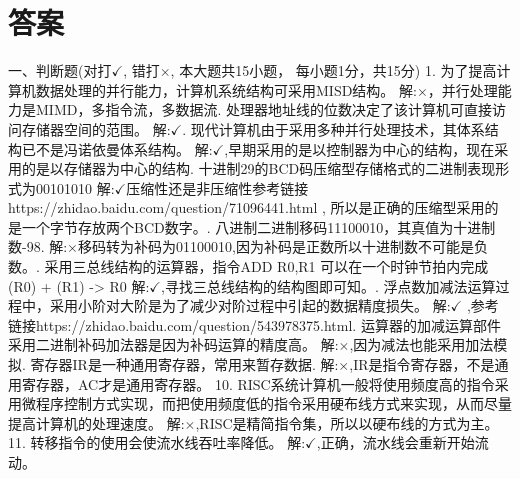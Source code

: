 \section{答案}
一、判断题(对打$\checkmark$, 错打$\times$, 本大题共15小题， 每小题1分，共15分)
1. 为了提高计算机数据处理的并行能力，计算机系统结构可采用MISD结构。\newline
解:$\times$，并行处理能力是MIMD，多指令流，多数据流. 处理器地址线的位数决定了该计算机可直接访问存储器空间的范围。\newline
解:$ \checkmark $. 现代计算机由于采用多种并行处理技术，其体系结构已不是冯诺依曼体系结构。\newline
解:$  \checkmark  $,早期采用的是以控制器为中心的结构，现在采用的是以存储器为中心的结构. 十进制29的BCD码压缩型存储格式的二进制表现形式为00101010\newline
解:$  \checkmark  $压缩性还是非压缩性参考链接 https://zhidao.baidu.com/question/71096441.html , 所以是正确的压缩型采用的是一个字节存放两个BCD数字。. 八进制二进制移码11100010，其真值为十进制数-98.\newline
解:$\times$移码转为补码为01100010,因为补码是正数所以十进制数不可能是负数。. 采用三总线结构的运算器，指令ADD R0,R1 可以在一个时钟节拍内完成 (R0) + (R1) -> R0\newline
解:$\checkmark$,寻找三总线结构的结构图即可知。. 浮点数加减法运算过程中，采用小阶对大阶是为了减少对阶过程中引起的数据精度损失。\newline
解:$\checkmark$ ,参考链接https://zhidao.baidu.com/question/543978375.html. 运算器的加减运算部件采用二进制补码加法器是因为补码运算的精度高。\newline
解:$\times$,因为减法也能采用加法模拟. 寄存器IR是一种通用寄存器，常用来暂存数据.\newline
解:$\times$,IR是指令寄存器，不是通用寄存器，AC才是通用寄存器。
10. RISC系统计算机一般将使用频度高的指令采用微程序控制方式实现，而把使用频度低的指令采用硬布线方式来实现，从而尽量提高计算机的处理速度。\newline
解:$\times$,RISC是精简指令集，所以以硬布线的方式为主。
11. 转移指令的使用会使流水线吞吐率降低。\newline
解:$\checkmark$,正确，流水线会重新开始流动。
